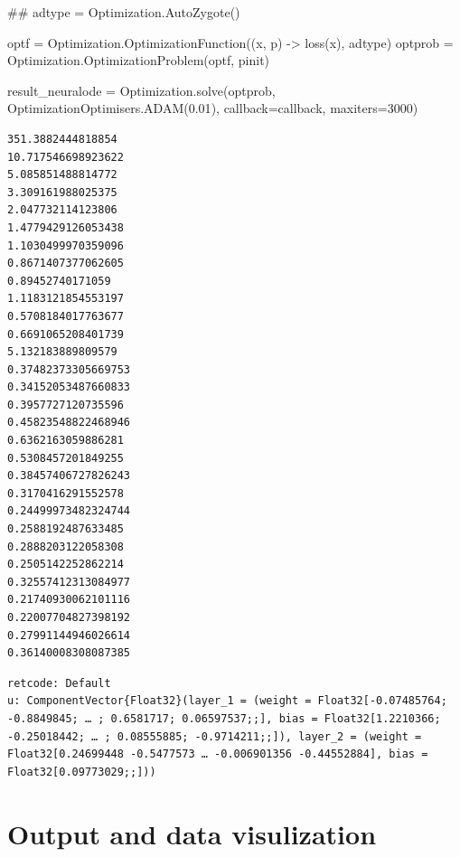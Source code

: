 \documentclass[
  letterpaper,
  DIV=11,
  numbers=noendperiod]{scrreport}
\newenvironment{Shaded}{\begin{snugshade}}{\end{snugshade}}
\newcommand{\CommentTok}[1]{\textcolor[rgb]{0.37,0.37,0.37}{#1}}
\newcommand{\FloatTok}[1]{\textcolor[rgb]{0.68,0.00,0.00}{#1}}
\newcommand{\FunctionTok}[1]{\textcolor[rgb]{0.28,0.35,0.67}{#1}}
\newcommand{\NormalTok}[1]{\textcolor[rgb]{0.00,0.23,0.31}{#1}}
\newcommand{\OperatorTok}[1]{\textcolor[rgb]{0.37,0.37,0.37}{#1}}
\begin{document}
\begin{Shaded}
\begin{Highlighting}[]
\CommentTok{\#\#}
\NormalTok{adtype }\OperatorTok{=}\NormalTok{ Optimization.}\FunctionTok{AutoZygote}\NormalTok{()}

\NormalTok{optf }\OperatorTok{=}\NormalTok{ Optimization.}\FunctionTok{OptimizationFunction}\NormalTok{((x, p) }\OperatorTok{{-}\textgreater{}} \FunctionTok{loss}\NormalTok{(x), adtype)}
\NormalTok{optprob }\OperatorTok{=}\NormalTok{ Optimization.}\FunctionTok{OptimizationProblem}\NormalTok{(optf, pinit)}

\NormalTok{result\_neuralode }\OperatorTok{=}\NormalTok{ Optimization.}\FunctionTok{solve}\NormalTok{(optprob,}
\NormalTok{    OptimizationOptimisers.}\FunctionTok{ADAM}\NormalTok{(}\FloatTok{0.01}\NormalTok{),}
\NormalTok{    callback}\OperatorTok{=}\NormalTok{callback,}
\NormalTok{    maxiters}\OperatorTok{=}\FloatTok{3000}\NormalTok{)}
\end{Highlighting}
\end{Shaded}

\begin{verbatim}
351.3882444818854
10.717546698923622
5.085851488814772
3.309161988025375
2.047732114123806
1.4779429126053438
1.1030499970359096
0.8671407377062605
0.89452740171059
1.1183121854553197
0.5708184017763677
0.6691065208401739
5.132183889809579
0.37482373305669753
0.34152053487660833
0.3957727120735596
0.45823548822468946
0.6362163059886281
0.5308457201849255
0.38457406727826243
0.3170416291552578
0.24499973482324744
0.2588192487633485
0.2888203122058308
0.2505142252862214
0.32557412313084977
0.21740930062101116
0.22007704827398192
0.27991144946026614
0.36140008308087385
\end{verbatim}

\begin{verbatim}
retcode: Default
u: ComponentVector{Float32}(layer_1 = (weight = Float32[-0.07485764; -0.8849845; … ; 0.6581717; 0.06597537;;], bias = Float32[1.2210366; -0.25018442; … ; 0.08555885; -0.9714211;;]), layer_2 = (weight = Float32[0.24699448 -0.5477573 … -0.006901356 -0.44552884], bias = Float32[0.09773029;;]))
\end{verbatim}

\section{Output and data
visulization}\label{output-and-data-visulization}
\end{document}

